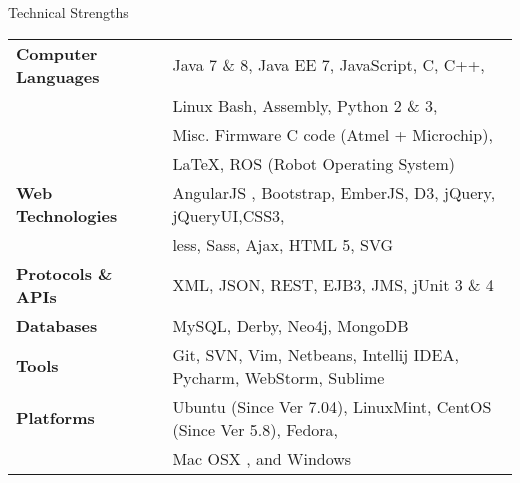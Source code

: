 \documentclass{resume} %
\begin{document}
    \begin{rSection}{Technical Strengths}

        \begin{tabular}{ @{} >{\bfseries}l @{\hspace{6ex}} l }
            Computer Languages & Java 7 \& 8, Java EE 7, JavaScript, C, C++,\\
            & Linux Bash, Assembly, Python 2 \& 3, \\
            & Misc. Firmware C code (Atmel + Microchip), \\
            & \LaTeX, ROS (Robot Operating System) \\
            Web Technologies & AngularJS , Bootstrap, EmberJS, D3, jQuery, jQueryUI,CSS3,\\
            & less, Sass, Ajax, HTML 5, SVG \\
            Protocols \& APIs & XML, JSON, REST, EJB3, JMS, jUnit 3 \& 4 \\
            Databases & MySQL, Derby, Neo4j, MongoDB \\
            Tools & Git, SVN, Vim, Netbeans, Intellij IDEA, Pycharm, WebStorm, Sublime \\
            Platforms & Ubuntu (Since Ver 7.04), LinuxMint, CentOS (Since Ver 5.8), Fedora, \\
            & Mac OSX , and Windows \\
        \end{tabular}

    \end{rSection}
\end{document}

